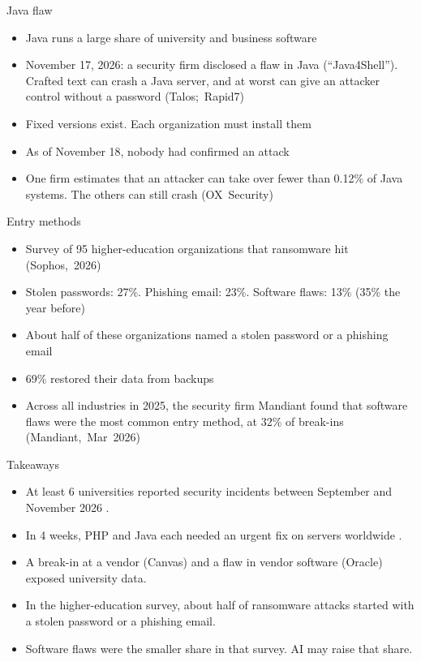 \documentclass[11pt]{beamer}
\newcommand{\srccite}[1]{{\scriptsize\textcolor{citecol}{#1}}}
\newcommand{\vfy}{\unskip}
\newcommand{\vfy}{\unskip\nobreakspace{\scriptsize\textcolor{citecol}{[verify]}}}
\renewcommand{\srccite}[1]{{\scriptsize\textcolor{citecol}{\mbox{#1}}}}
\begin{document}
\begin{frame}{Java flaw}
\pause
\begin{itemize}\setlength\itemsep{8pt}
\item Java runs a large share of university and business software \pause
\item November 17, 2026: a security firm disclosed a flaw in Java (``Java4Shell''). Crafted text can crash a Java server, and at worst can give an attacker control without a password \srccite{(Talos; Rapid7)} \vfy \pause
\item Fixed versions exist. Each organization must install them \vfy \pause
\item As of November 18, nobody had confirmed an attack \vfy \pause
\item One firm estimates that an attacker can take over fewer than 0.12\% of Java systems. The others can still crash \srccite{(OX Security)} \vfy
\end{itemize}
\end{frame}


\begin{frame}{Entry methods}
\pause
\begin{itemize}\setlength\itemsep{8pt}
\item Survey of 95 higher-education organizations that ransomware hit \srccite{(Sophos, 2026)} \vfy \pause
\item Stolen passwords: 27\%. Phishing email: 23\%. Software flaws: 13\% (35\% the year before) \vfy \pause
\item[$\rightarrow$] About half of these organizations named a stolen password or a phishing email \pause
\item 69\% restored their data from backups \vfy \pause
\item Across all industries in 2025, the security firm Mandiant found that software flaws were the most common entry method, at 32\% of break-ins \srccite{(Mandiant, Mar 2026)}
\end{itemize}
\end{frame}


\begin{frame}{Takeaways}
\vfill
\pause
\begin{itemize}\setlength\itemsep{14pt}
\item At least 6 universities reported security incidents between September and November 2026 \vfy. \pause
\item In 4 weeks, PHP and Java each needed an urgent fix on servers worldwide \vfy. \pause
\item A break-in at a vendor (Canvas) and a flaw in vendor software (Oracle) exposed university data. \pause
\item In the higher-education survey, about half of ransomware attacks started with a stolen password or a phishing email. \pause
\item[$\rightarrow$] Software flaws were the smaller share in that survey. AI may raise that share.
\end{itemize}
\vfill
\end{frame}
\end{document}
